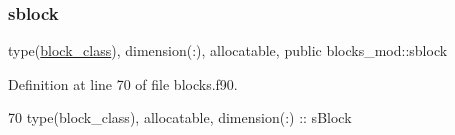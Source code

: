 \subsubsection{\texorpdfstring{sblock}{sblock}}
{\footnotesize\ttfamily type(\mbox{\hyperlink{structblocks__mod_1_1block__class}{block\+\_\+class}}), dimension(\+:), allocatable, public blocks\+\_\+mod\+::sblock}



Definition at line 70 of file blocks.\+f90.


\begin{DoxyCode}
70     \textcolor{keywordtype}{type}(block\_class), \textcolor{keywordtype}{allocatable}, \textcolor{keywordtype}{dimension(:)} :: sBlock
\end{DoxyCode}
